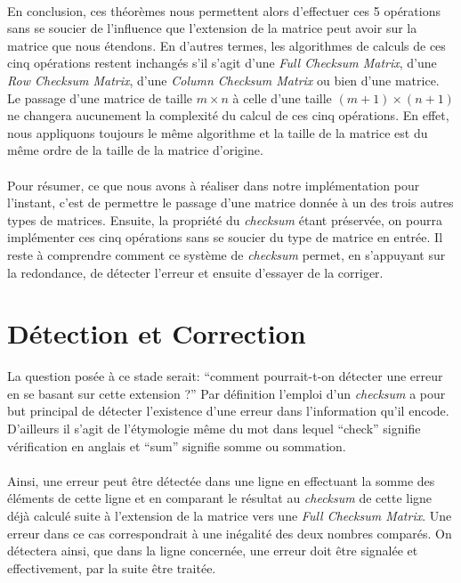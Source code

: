 \documentclass[a4paper, 10pt]{report}
\begin{document}
\paragraph*{}
En conclusion, ces théorèmes nous permettent alors d’effectuer ces 5 opérations sans se soucier de l’influence 
que l’extension de la matrice peut avoir sur la matrice que nous étendons. En d’autres termes,  les algorithmes 
de calculs de ces cinq opérations restent inchangés s’il s’agit d’une \textit{Full Checksum Matrix}, d’une 
\textit{Row Checksum Matrix}, d’une \textit{Column Checksum Matrix} ou bien d’une matrice.\newline
Le passage d’une matrice de taille $m \times n$ à celle d’une taille $(m+1) \times (n+1)$ ne changera aucunement 
la complexité du calcul de ces cinq opérations. En effet, nous appliquons toujours le même algorithme et la taille 
de la matrice est du même ordre de la taille de la matrice d’origine.
\paragraph*{}
Pour résumer, ce que nous avons à réaliser dans notre implémentation pour l’instant, c'est de permettre le passage
d’une matrice donnée à un des trois autres types de matrices. Ensuite, la propriété du \textit{checksum} 
étant préservée, on pourra implémenter ces cinq opérations sans se soucier du type de matrice en entrée.\newline
Il reste à comprendre comment ce système de \textit{checksum}  permet, en s’appuyant sur la redondance, de détecter 
l’erreur et ensuite d’essayer de la corriger.

\section{Détection et Correction}
La question posée à ce stade serait: ``comment pourrait-t-on détecter une erreur en se basant sur cette extension ?''
Par définition l’emploi d’un \textit{checksum} a pour but principal de 
détecter l’existence d’une erreur dans l’information qu’il encode. D’ailleurs il s’agit de l’étymologie même du mot 
dans lequel ``check'' signifie vérification en anglais et ``sum'' signifie somme ou sommation.
\paragraph*{} 
Ainsi, une erreur peut être détectée dans une ligne en effectuant la somme des éléments de cette ligne 
et en comparant le résultat au \textit{checksum} de cette ligne déjà calculé suite à l’extension de la matrice vers 
une \textit{Full Checksum Matrix}. Une erreur dans ce cas correspondrait à une inégalité des deux nombres comparés. 
On détectera ainsi, que dans la ligne concernée, une erreur doit être signalée et effectivement, par la suite être traitée.
\end{document}
